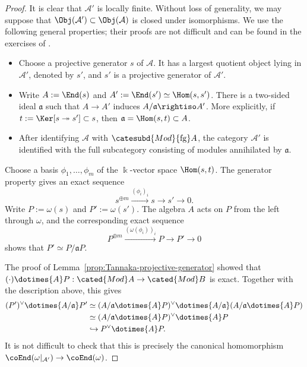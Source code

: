 \begin{proof}
	It is clear that $\mathcal{A}'$ is locally finite. Without loss of
	generality, we may suppose that
	$\Obj(\mathcal{A}')\subset\Obj(\mathcal{A})$ is closed under
	isomorphisms. We use the following general properties; their proofs are
	not difficult and can be found in the exercises of .
	\begin{itemize}
		\item Choose a projective generator $s$ of $\mathcal{A}$. It has a
		largest quotient object lying in $\mathcal{A}'$, denoted by $s'$, and
		$s'$ is a projective generator of $\mathcal{A}'$.
		\item Write $A:=\End(s)$ and
		$A':=\End(s')\simeq\Hom(s,s')$. There is a two-sided ideal
		$\mathfrak a$ such that $A\to A'$ induces
		$A/\mathfrak a\rightiso A'$. More explicitly, if
		$t:=\Ker[s\twoheadrightarrow s']\subset s$, then
		$\mathfrak a=\Hom(s,t)\subset A$.
		\item After identifying $\mathcal{A}$ with
		$\catesubd{Mod}{\mathrm{fg}}A$, the category $\mathcal{A}'$ is
		identified with the full subcategory consisting of modules annihilated
		by $\mathfrak a$.
	\end{itemize}

	Choose a basis $\phi_1,\ldots,\phi_m$ of the $\Bbbk$-vector space
	$\Hom(s,t)$. The generator property gives an exact sequence
	\[ s^{\oplus m} \xrightarrow{(\phi_i)_i} s \to s' \to 0. \]
	Write $P:=\omega(s)$ and $P':=\omega(s')$. The algebra $A$ acts on $P$
	from the left through $\omega$, and the corresponding exact sequence
	\[ P^{\oplus m} \xrightarrow{(\omega(\phi_i))_i} P \to P' \to 0 \]
	shows that $P'\simeq P/\mathfrak aP$.

	The proof of Lemma~\ref{prop:Tannaka-projective-generator} showed that
	$(\mathord\cdot)\dotimes{A}P:\cated{Mod}A\to\cated{Mod}B$ is exact.
	Together with the description above, this gives
	\begin{align*}
		(P')^\vee \dotimes{A/\mathfrak{a}} P' & \simeq (A/\mathfrak{a} \dotimes{A} P)^\vee \dotimes{A/\mathfrak{a}} ( A/\mathfrak{a} \dotimes{A} P) \\
		& \simeq (A/\mathfrak{a} \dotimes{A} P)^\vee \dotimes{A} P \\
		& \hookrightarrow P^\vee \dotimes{A} P.
	\end{align*}
	It is not difficult to check that this is precisely the canonical
	homomorphism $\coEnd(\omega|_{\mathcal{A}'})\to\coEnd(\omega)$.
\end{proof}

